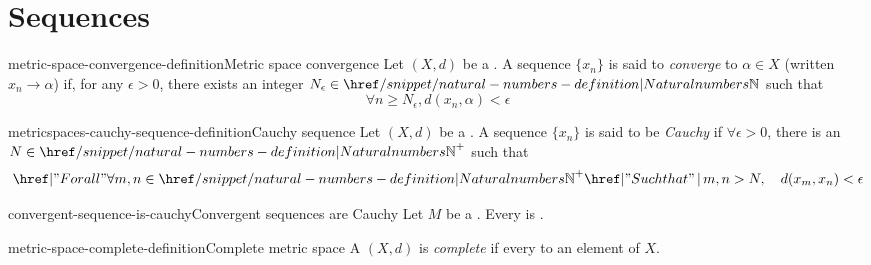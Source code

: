 \documentclass[preview]{standalone}
\begin{document}
\genpage

\section{Sequences}

\begin{snippetdefinition}{metric-space-convergence-definition}{Metric space convergence}
    Let \((X, d)\) be a \metricspace.
    A sequence \(\{x_n\}\) is said to \textit{converge}
    to \(\alpha \in X\) (written \(x_n\to\alpha\)) if, for any \(\epsilon > 0\),
    there exists an integer \(N_\epsilon \in \naturalnumbers\) such that
    \[\forall n \geq N_\epsilon, d(x_n, \alpha) < \epsilon\]
\end{snippetdefinition}


\begin{snippetdefinition}{metricspaces-cauchy-sequence-definition}{Cauchy sequence}
    Let \((X, d)\) be a \metricspace.
    A sequence \(\{x_n\}\) is said to be \textit{Cauchy}
    if \(\forall \epsilon > 0\), there is an \(N\in{\naturalnumbers}^+\)
    such that \[ \forall m,n \in {\naturalnumbers}^+ \suchthat m,n > N, \quad d(x_m, x_n) < \epsilon \]
\end{snippetdefinition}


\begin{snippetproposition}{convergent-sequence-is-cauchy}{Convergent sequences are Cauchy}
    Let \(M\) be a \metricspace.
    Every  is \mscauchy.
\end{snippetproposition}

\begin{snippetdefinition}{metric-space-complete-definition}{Complete metric space}
    A \metricspace \((X, d)\) is \textit{complete} if every 
    \msconvergence[converges] to an element of \(X\).
\end{snippetdefinition}

\end{document}
